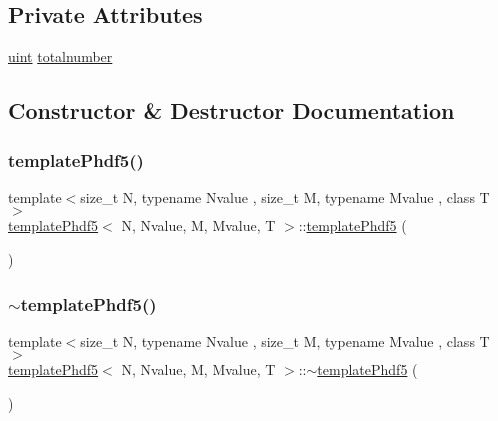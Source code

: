 \subsection*{Private Attributes}
\begin{DoxyCompactItemize}
\item 
\mbox{\hyperlink{definitions_8h_a69aa29b598b851b0640aa225a9e5d61d}{uint}} \mbox{\hyperlink{classtemplatePhdf5_a9de9eb2740b4feb7029e3741cf349a90}{totalnumber}}
\end{DoxyCompactItemize}


\subsection{Constructor \& Destructor Documentation}
\mbox{\label{classtemplatePhdf5_a3b4cd745e1421e2fe9fbb91de266984a}} 
\subsubsection{\texorpdfstring{template\+Phdf5()}{templatePhdf5()}}
{\footnotesize\ttfamily template$<$size\+\_\+t N, typename Nvalue , size\+\_\+t M, typename Mvalue , class T $>$ \\
\mbox{\hyperlink{classtemplatePhdf5}{template\+Phdf5}}$<$ N, Nvalue, M, Mvalue, T $>$\+::\mbox{\hyperlink{classtemplatePhdf5}{template\+Phdf5}} (\begin{DoxyParamCaption}{ }\end{DoxyParamCaption})\hspace{0.3cm}{\ttfamily [inline]}}

\mbox{\label{classtemplatePhdf5_ac84ebe1ccff193434ab13172e69b338a}} 
\subsubsection{\texorpdfstring{$\sim$template\+Phdf5()}{~templatePhdf5()}}
{\footnotesize\ttfamily template$<$size\+\_\+t N, typename Nvalue , size\+\_\+t M, typename Mvalue , class T $>$ \\
\mbox{\hyperlink{classtemplatePhdf5}{template\+Phdf5}}$<$ N, Nvalue, M, Mvalue, T $>$\+::$\sim$\mbox{\hyperlink{classtemplatePhdf5}{template\+Phdf5}} (\begin{DoxyParamCaption}{ }\end{DoxyParamCaption})\hspace{0.3cm}{\ttfamily [inline]}}



